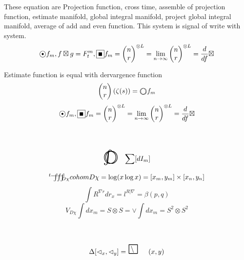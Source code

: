 \documentclass{jsarticle}
\begin{document}
 \newcommand{\whitewithbodercirclevariiint}{%
	 \begin{picture}(30,45)
		 \put(0,0){\scalebox{2.0}[2]{$\whitewithbodercircle$}}
		 \put(0,0){\scalebox{2.0}[2]{$\variiint$}}
	 \end{picture}%
	 }
 
 \newcommand{\average}{%
	  \begin{picture}(30,45)
		  \put(0,0){\scalebox{2.0}[2]{$\square$}}
		  \put(4,4){$\setminus$}
	  \end{picture}%
  } 
 
 These equation are Projection function, cross time, assemble of projection
 function, estimate manifold, global integral manifold, project global 
 integral manifold, average of add and even function.
 This system is signal of write with system.
  $$ \whitewithblack f_m , f \boxtimes g = F^{m}_t, 
  \whitewithblacksquare f_m = {\begin{pmatrix}
	  n \\
  r \end{pmatrix}}^{\otimes L} = \lim_{n \to \infty}
  {\begin{pmatrix}
	  n \\
  r \end{pmatrix}}^{\otimes L} = {d \over {d f}}\boxtimes $$

  \newcommand{\whitewithwhitecircle}
  {\text{\textcircled{\phantom{\textbullet}}}}
  Estimate function is equal with dervargence function
  $$ \begin{pmatrix}
	  n \\
  r \end{pmatrix}(\zeta(s)) = \whitewithbodercircle f_m $$
  $$ \whitewithblack f_m ,
  \whitewithblacksquare f_m = {\begin{pmatrix}
	  n \\
  r \end{pmatrix}}^{\otimes L} = \lim_{n \to \infty}
  {\begin{pmatrix}
	  n \\
  r \end{pmatrix}}^{\otimes L} = {d \over {d f}}\boxtimes $$


 

$$ \whitewithbodercircleint \sum [dI_m] $$
$$ {}^t\variiint_{D\chi} cohom D\chi = \log(x\log x) = [x_m,y_m]\times
[x_n,y_n] $$
$$ \int R^{\nabla r}dr_x = l^{R|\nabla} = \beta(p,q) $$
$$ V_{D\chi}\int dx_m = S \otimes S = \vee\int dx_m = S^2 \otimes S^2 $$
$$ \Delta[\vartriangleleft_x,\vartriangleleft_y] = \average(x,y) $$
\end{document}
